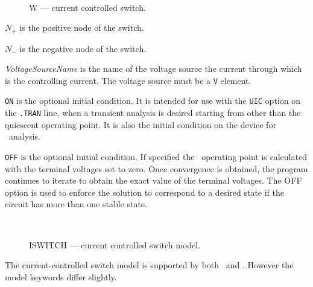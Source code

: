 \begin{figure}[h]
\centering
\ 
\caption{W --- current controlled switch.}
\end{figure}



\vspace{-0.2in}
\begin{widelist}
\item[$N_{+}$] is the positive node of the switch.
\item[$N_{-}$] is the negative node of the switch.
\item[{\it VoltageSourceName}] is the name of the voltage source the current
through which is the controlling current.
The voltage source must be a {\tt V} element.
\item[{\tt ON}] is the optional initial condition.
It is intended for use with the {\tt UIC} option
on  the  {\tt .TRAN}  line,  when  a transient analysis is desired
starting from other than the quiescent operating point.
It is also the initial condition on the device for \dc\ analysis.
\item[{\tt OFF}] is the optional initial condition.
If specified the \dc\ operating point is calculated with the
terminal voltages set to zero.  Once convergence is obtained, the
program continues to iterate to obtain the exact  value of the
terminal  voltages.  The OFF option is used to enforce the
solution to  correspond  to  a  desired  state if the circuit has
more than one stable state.
\end{widelist}
\begin{figure}[h]
\centering
\ 
\caption{ISWITCH --- current controlled switch model. \label{iswitch}}
\end{figure}

The current-controlled switch model is supported by
both \spicethree\ and \pspice. However the model keywords differ slightly.\\[0.1in]


